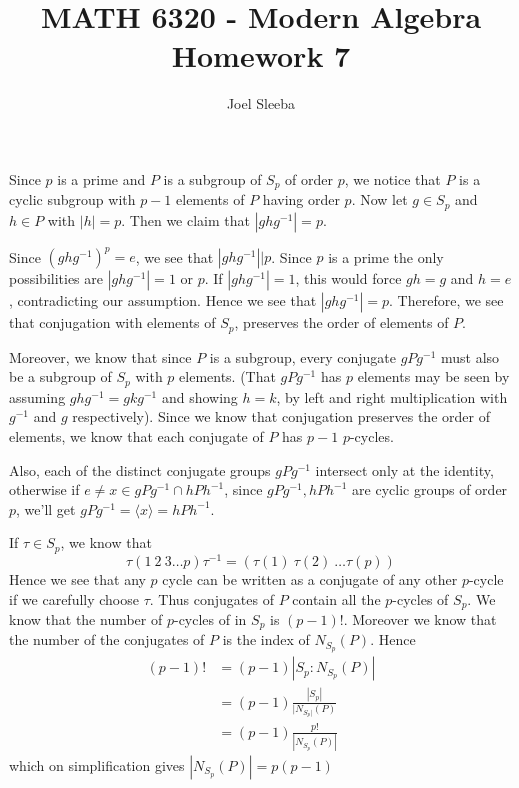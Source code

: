 \documentclass[12pt]{exam}
\theoremstyle{plain} %
\theoremstyle{definition} %
\theoremstyle{remark} %
\begin{document}
\title{MATH 6320 - Modern Algebra \\ Homework 7}

\author{
  Joel Sleeba \\
}

\maketitle
\printanswers
\unframedsolutions

\begin{questions}

  \question
  \begin{solution}
    Since $p$ is a prime and $P$ is a subgroup of $S_p$ of order $p$,
    we notice that $P$ is a cyclic subgroup with $p-1$ elements of
    $P$ having order $p$. Now let $g \in S_p$ and $h \in P$ with $|h|
    = p$. Then we claim that $|ghg^{-1}| = p$.

    Since $(ghg^{-1})^p =
    e$, we see that $|ghg^{-1}|\big| p$. Since $p$ is a prime the
    only possibilities are $|ghg^{-1}| = 1$ or $p$. If $|ghg^{-1}| =
    1$, this would force $gh = g$ and $h = e$, contradicting our
    assumption. Hence we see that $|ghg^{-1}| = p$. Therefore, we see
    that conjugation with elements of $S_p$, preserves the order of
    elements of $P$.

    Moreover, we know that since $P$ is a subgroup, every conjugate
    $gPg^{-1}$ must also be a subgroup of $S_p$ with $p$ elements.
    (That $gPg^{-1}$ has $p$ elements may be seen by assuming
      $ghg^{-1} = gkg^{-1}$ and showing $h = k$, by left and right
    multiplication with $g^{-1}$ and $g$ respectively). Since we know
    that conjugation preserves the order of elements, we know that
    each conjugate of $P$ has $p-1$ $p$-cycles.

    Also, each of the distinct conjugate groups $gPg^{-1}$ intersect
    only at the identity, otherwise if $e \neq x \in gPg^{-1} \cap
    hPh^{-1}$, since $gPg^{-1}, hPh^{-1}$ are cyclic groups of order
    $p$, we'll get $gPg^{-1} = \langle x  \rangle = hPh^{-1}$.

    If $\tau \in S_p$, we know that \[
      \tau (1\ 2 \ 3 \ldots p) \tau^{-1} = (\tau(1)\ \tau(2)\ \ldots \tau(p))
    \]
    Hence we see that any $p$ cycle can be written as a conjugate of any
    other $p$-cycle if we carefully choose $\tau$. Thus conjugates of
    $P$ contain all the $p$-cycles of $S_p$. We know that the number
    of $p$-cycles of in $S_p$ is $(p-1)!$. Moreover we
    know that the number of the conjugates of $P$ is the index of
    $N_{S_p}(P)$. Hence
    \begin{align*}
      (p-1)! &= (p-1) |S_p: N_{S_p}(P)| \\
      &= (p-1) \frac{|S_p|}{|N_{S_p|}(P)} \\
      &= (p-1) \frac{p!}{|N_{S_p}(P)|}
    \end{align*}
    which on simplification gives $|N_{S_p}(P)| = p(p-1)$
  \end{solution}


\end{questions}
\end{document}
